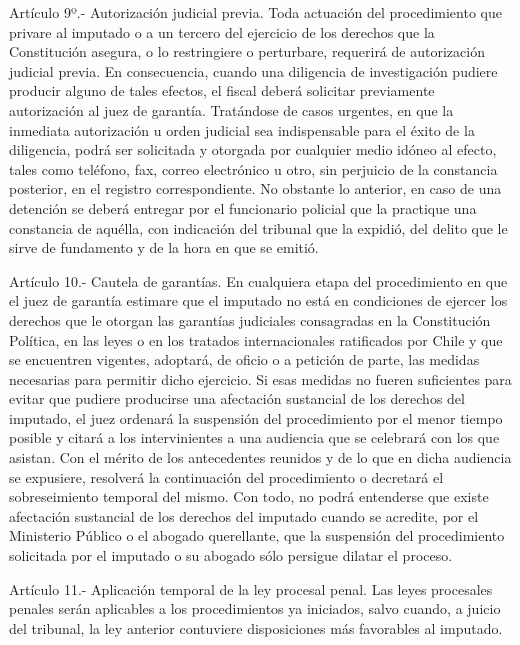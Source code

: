     Artículo 9º.- Autorización judicial previa. Toda actuación del procedimiento que privare al imputado o a un tercero del ejercicio de los derechos que la Constitución asegura, o lo restringiere o perturbare, requerirá de autorización judicial previa.
    En consecuencia, cuando una diligencia de investigación pudiere producir alguno de tales efectos, el fiscal deberá solicitar previamente autorización al juez de garantía.
    Tratándose de casos urgentes, en que la inmediata autorización u orden judicial sea indispensable para el éxito de la diligencia, podrá ser solicitada y otorgada por cualquier medio idóneo al efecto, tales como teléfono, fax, correo electrónico u otro, sin perjuicio de la constancia posterior, en el registro correspondiente. No obstante lo anterior, en caso de una detención se deberá entregar por el funcionario policial que la practique una constancia de aquélla, con indicación del tribunal que la expidió, del delito que le sirve de fundamento y de la hora en que se emitió.

    Artículo 10.- Cautela de garantías. En cualquiera etapa del procedimiento en que el juez de garantía estimare que el imputado no está en condiciones de ejercer los derechos que le otorgan las garantías judiciales consagradas en la Constitución Política, en las leyes o en los tratados internacionales ratificados por Chile y que se encuentren vigentes, adoptará, de oficio o a petición de parte, las medidas necesarias para permitir dicho ejercicio.
    Si esas medidas no fueren suficientes para evitar que pudiere producirse una afectación sustancial de los derechos del imputado, el juez ordenará la suspensión del procedimiento por el menor tiempo posible y citará a los intervinientes a una audiencia que se celebrará con los que asistan. Con el mérito de los antecedentes reunidos y de lo que en dicha audiencia se expusiere, resolverá la continuación del procedimiento o decretará el sobreseimiento temporal del mismo.
    Con todo, no podrá entenderse que existe afectación sustancial de los derechos del imputado cuando se acredite, por el Ministerio Público o el abogado querellante, que la suspensión del procedimiento solicitada por el imputado o su abogado sólo persigue dilatar el proceso.

    Artículo 11.- Aplicación temporal de la ley procesal penal. Las leyes procesales penales serán aplicables a los procedimientos ya iniciados, salvo cuando, a juicio del tribunal, la ley anterior contuviere disposiciones más favorables al imputado.

